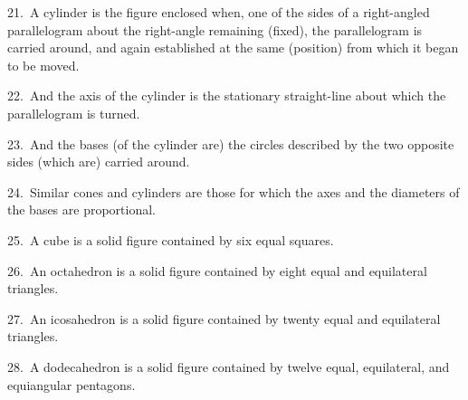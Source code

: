 \begin{Parallel}{}{}
{21.~A cylinder is the figure enclosed when, one of the sides
 of a right-angled parallelogram about the right-angle remaining (fixed),
 the parallelogram is carried around, and again established at the same
 (position) from which it began to be moved.
 
22.~And the axis of the cylinder is the stationary straight-line about which
 the parallelogram is turned.
 
23.~And the bases (of the cylinder are) the circles described by the
 two opposite sides (which are) carried around.
 
24.~Similar cones and cylinders are those for which the axes and the diameters
 of the bases are proportional.
 
25.~A cube is a solid figure contained by six equal squares.

26.~An octahedron is a solid figure contained by eight equal and
 equilateral triangles.
 
 27.~An icosahedron is a solid figure contained by twenty equal and
 equilateral triangles.
 
28.~A dodecahedron is a solid figure contained by twelve equal,
 equilateral, and equiangular pentagons.}
 \end{Parallel}
 
